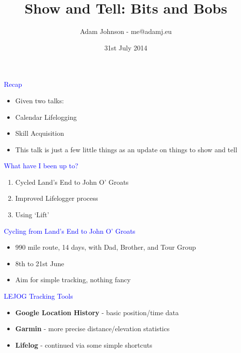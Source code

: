 \documentclass[landscape]{slides}
\title{Show and Tell: Bits and Bobs}
\author{Adam Johnson - me@adamj.eu}
\date{31st July 2014}
\begin{document}
\maketitle


\begin{slide}

    \textcolor{blue}{\Large{Recap}}

    \begin{itemize}
        \item Given two talks:
        \item Calendar Lifelogging
        \item Skill Acquisition
        \item This talk is just a few little things as an update on things to show and tell
    \end{itemize}

\end{slide}


\begin{slide}

    \textcolor{blue}{\Large{What have I been up to?}}

    \begin{enumerate}
        \item Cycled Land's End to John O' Groats
        \item Improved Lifelogger process
        \item Using `Lift'
    \end{enumerate}

\end{slide}




\begin{slide}

    \textcolor{blue}{\Large{Cycling from Land's End to John O' Groats}}

    \begin{itemize}
        \item 990 mile route, 14 days, with Dad, Brother, and Tour Group
        \item 8th to 21st June
        \item Aim for simple tracking, nothing fancy
    \end{itemize}

\end{slide}



\begin{slide}

    \textcolor{blue}{\Large{LEJOG Tracking Tools}}

    \begin{itemize}
        \item \textbf{Google Location History} - basic position/time data
        \item \textbf{Garmin} - more precise distance/elevation statistics
        \item \textbf{Lifelog} - continued via some simple shortcuts
    \end{itemize}

\end{slide}
\end{document}
